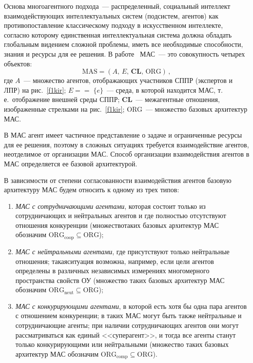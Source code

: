\begin{multicols}{2}
  Основа многоагентного подхода~--- распределенный, социальный интеллект 
взаимо\-дей\-ст\-ву\-ющих интеллектуальных систем (подсистем, агентов) как 
противопоставление классическому подходу в искусственном интеллекте, 
согласно которому единственная интеллектуальная система должна обладать 
глобальным видением сложной проблемы, иметь все необходимые 
способности, знания и ресурсы для ее решения. В работе~\cite{8kir} МАС~--- 
это совокупность четырех объектов:
    \begin{equation}
\mathrm{MAS} = (A,\,E,\,\mathbf{CL},\,\mathrm{ORG})\,,
\label{e1kir}
\end{equation}
где $A$~--- множество агентов, отображающих участников СППР (экспертов и 
ЛПР) на рис.~\ref{f1kir}; $E =$\linebreak $=\;\{e\}$~--- среда, в которой находится МАС, т.\,е.\
отображение внешней среды СППР; \textbf{CL}~--- межагентные отношения, 
изображенные стрелками на рис.~\ref{f1kir}; ORG~--- множество базовых 
архитектур МАС.
  
  В МАС агент имеет частичное представление о задаче и ограниченные 
ресурсы для ее решения, поэтому в сложных ситуациях требуется 
взаимодействие агентов, неотделимое от организации МАС. Способ 
организации взаимодействия агентов в МАС определяется ее базовой 
архитектурой.
  
  В зависимости от степени согласованности взаимодействия агентов базовую 
архитектуру МАС будем относить к одному из трех типов: 
  \begin{enumerate}[(1)]
  \item
  \textit{МАС с сотрудничающими агентами}, которая состоит только из 
сотрудничающих и нейт\-раль\-ных агентов и где полностью от\-сут\-ст\-ву\-ют 
отношения конкуренции (множество\linebreak таких базовых архитектур МАС 
обозначим $\mathrm{ORG_{coop}} \subseteq \mathrm{ORG}$); 
  \item
  \textit{МАС с нейтральными агентами}, где присутст\-вуют только 
нейтральные отношения; такая\linebreak ситуация возможна, например, если цели 
агентов определены в различных независимых измерениях многомерного 
пространства свойств ОУ (множество таких базовых архитектур МАС 
обозначим $\mathrm{ORG}_{\mathrm{neut}} \subseteq \mathrm{ORG}$); 
  \item
  \textit{МАС с конкурирующими агентами}, в которой есть хотя бы одна пара 
агентов с отношением конкуренции; в таких МАС могут быть также 
нейтральные и сотрудничающие агенты; при наличии сотрудничающих агентов 
они могут рассматриваться как единый <<суперагент>>, и тогда все агенты 
станут только конкурирующими или нейтральными (множество таких базовых 
архитектур МАС обозначим $\mathrm{ORG}_{\mathrm{comp}} \subseteq \mathrm{ORG}$).
  \end{enumerate}
  

\end{multicols}
